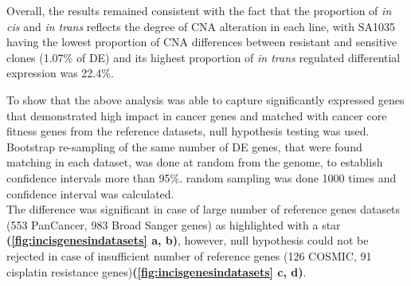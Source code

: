 
 Overall, the results remained consistent with the fact that the proportion of \textit{in cis} and \textit{in trans} reflects the degree of CNA alteration in each line, with SA1035 having the lowest proportion of CNA differences between resistant and sensitive clones (1.07\% of DE) and its highest proportion of \textit{in trans} regulated differential expression was 22.4\%.
 
 To show that the above analysis was able to capture significantly expressed genes that demonstrated high impact in cancer genes and matched with cancer core fitness genes from the reference datasets, null hypothesis testing was used. Bootstrap re-sampling of the same number of DE genes, that were found matching in each dataset, was done at random from the genome, to establish confidence intervals more than 95\%. random sampling was done 1000 times and confidence interval was calculated.
\\ 
 The difference was significant in case of large number of reference genes datasets (553 PanCancer, 983 Broad Sanger genes) as highlighted with a star \textbf{(\autoref{fig:incisgenesindatasets} a, b)}, however, null hypothesis could not be rejected in case of insufficient number of reference genes (126 COSMIC, 91 cisplatin resistance genes)\textbf{(\autoref{fig:incisgenesindatasets} c, d)}.






 
